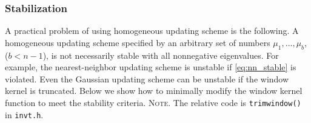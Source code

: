 \documentclass[reprint, floatfix]{revtex4-1}
\newcommand{\note}[1]{{\color{DarkGreen}\footnotesize \textsc{Note.} #1}}
\begin{document}



\subsubsection{\label{sec:stabilize_wband}
Stabilization}



A practical problem of using homogeneous updating scheme
is the following.
%
A homogeneous updating scheme
specified by an arbitrary set of numbers
$\mu_1, \dots, \mu_b$, ($b < n - 1$),
is not necessarily stable
with all nonnegative eigenvalues.
%
%
For example, the nearest-neighbor updating scheme
is unstable if \eqref{eq:nn_stable} is violated.
%
Even the Gaussian updating scheme can be unstable
if the window kernel is truncated.
%
Below we show how to minimally modify
the window kernel function
to meet the stability criteria.
%
\note{The relative code is \texttt{trimwindow()} in \texttt{invt.h}.
}
\end{document}
